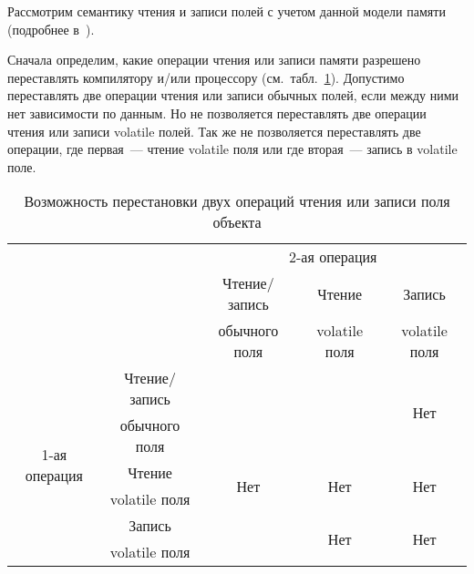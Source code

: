 \documentclass[14pt,titlepage]{extarticle}
\newcommand{\eng}[1]{{\English#1}}
\begin{document}
      Рассмотрим семантику чтения и записи полей с учетом данной
      модели памяти (подробнее в~\cite{jsr133_cookbook}).

      Сначала определим, какие операции чтения или записи памяти разрешено
      переставлять компилятору и/или процессору
      (см.~табл.~\ref{tabular:can_reorder}).
      Допустимо переставлять две операции чтения или записи обычных полей, если
      между ними нет зависимости по данным. Но не позволяется переставлять две
      операции чтения или записи \eng{volatile} полей. Так же не позволяется
      переставлять две операции, где первая~--- чтение \eng{volatile} поля или
      где вторая~--- запись в \eng{volatile} поле.

      \begin{table}[!htb]
        \centering

        \def\yes{\multirow{2}{*}{}}
        \def\no{\multirow{2}{*}{Нет}}

        \begin{tabular}{ |c|c|c|c|c| }
          \cline{3-5}
          \multicolumn{2}{c|}{} & \multicolumn{3}{c|}{2-ая операция} \\
          \cline{3-5}
          \multicolumn{2}{c|}{} & Чтение/запись & Чтение              & Запись \\
          \multicolumn{2}{c|}{} & обычного поля & \eng{volatile} поля & \eng{volatile} поля \\
          \hline
          \multirow{6}{*}{\begin{sideways}1-ая операция\end{sideways}}
          & Чтение/запись       & \yes & \yes & \no \\
          & обычного поля       &      &      &     \\ \cline{2-5}
          & Чтение              & \no  & \no  & \no \\
          & \eng{volatile} поля &      &      &     \\ \cline{2-5}
          & Запись              & \yes & \no  & \no \\
          & \eng{volatile} поля &      &      &     \\ \hline
        \end{tabular}
        \caption{Возможность перестановки двух операций чтения или записи поля
                 объекта}
        \label{tabular:can_reorder}
      \end{table}
\end{document}
